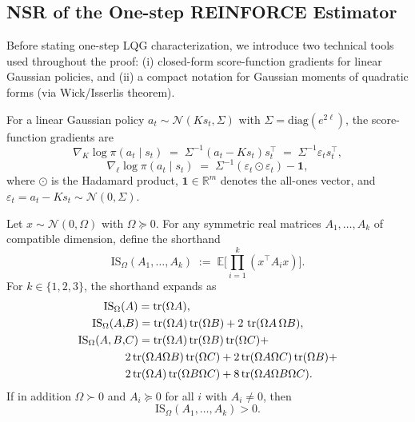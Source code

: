 \subsection{NSR of the One-step REINFORCE Estimator}\label{sec:one-step-lqg}

Before stating one-step LQG characterization, we introduce two technical tools used throughout the proof: (i) closed-form score-function gradients for linear Gaussian policies, and (ii) a compact notation for Gaussian moments of quadratic forms (via Wick/Isserlis theorem).

\begin{lemma}\label{lem:lqg-policy-score}
  For a linear Gaussian policy $a_t \sim \mathcal N(K s_t, \Sigma)$ with $\Sigma=\text{diag}(e^{2\ell})$, the score-function gradients are
  \[
  \nabla_K \log\pi(a_t\mid s_t) \;=\; \Sigma^{-1}(a_t - K s_t) s_t^\top \;=\; \Sigma^{-1}\varepsilon_t s_t^\top,
  \]
  \[
  \nabla_{\ell} \log\pi(a_t\mid s_t) \;=\; \Sigma^{-1}(\varepsilon_t \odot \varepsilon_t) - \mathbf 1,
  \]
  where $\odot$ is the Hadamard product, \(\mathbf 1\in\mathbb R^m\) denotes the all-ones vector, and \(\varepsilon_t = a_t - K s_t\sim\mathcal N(0,\Sigma)\).
\end{lemma}

\begin{lemma}\label{lem:IS_shorthand}
Let $x\sim\mathcal N(0,\Omega)$ with $\Omega\succeq 0$. For any symmetric real matrices
$A_1,\dots,A_k$ of compatible dimension, define the shorthand
\begin{equation}\label{eq:IS_shorthand}
\mathrm{IS}_{\Omega}(A_1,\dots,A_k)
\;:=\;
\mathbb E\Big[\prod_{i=1}^k (x^\top A_i x)\Big].
\end{equation}
For $k\in\{1,2,3\}$, the shorthand expands as
\vspace{-3mm}
\begin{subequations}\label{eq:IS_123}
\begin{align}
\mathrm{IS}_{\Omega}(&A)
=\operatorname{tr}(\Omega A),\\
\mathrm{IS}_{\Omega}(A,&B)
=\operatorname{tr}(\Omega A)\operatorname{tr}(\Omega B)+2\,\operatorname{tr}(\Omega A\,\Omega B),\\
\mathrm{IS}_{\Omega}(A,B,&C)
=\operatorname{tr}(\Omega A)\operatorname{tr}(\Omega B)\operatorname{tr}(\Omega C)
+ \nonumber \\
&2\operatorname{tr}(\Omega A\Omega B)\operatorname{tr}(\Omega C)+2\operatorname{tr}(\Omega A\Omega C)\operatorname{tr}(\Omega B)+ \nonumber \\
&2\operatorname{tr}(\Omega A)\operatorname{tr}(\Omega B\Omega C)+8\operatorname{tr}(\Omega A\Omega B\Omega C).
\end{align}
\end{subequations}
If in addition $\Omega\succ 0$ and $A_i\succeq 0$ for all $i$ with $A_i\neq0$, then 
\begin{equation}\label{eq:IS_positive}
\mathrm{IS}_{\Omega}(A_1,\dots,A_k)>0.
\end{equation}
\end{lemma}

